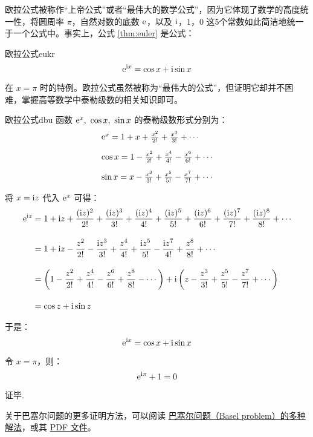 \documentclass[12pt, cn]{elegantart}
\begin{document}
欧拉公式被称作“上帝公式”或者“最伟大的数学公式”，因为它体现了数学的高度统一性，将圆周率 $\pi$，自然对数的底数 $\mathrm{e}$，以及 $\mathrm{i}$，$1$，$0$ 这5个常数如此简洁地统一于一个公式中。事实上，公式 \eqref{thm:euler} 是公式：
\begin{theorem}{欧拉公式}{eukr}
	\begin{equation}\label{ohy}
	\mathrm{e}^{\mathrm{i} x}=\cos x+\mathrm{i} \sin x
\end{equation}
\end{theorem}

在 $x=\pi$ 时的特例。欧拉公式虽然被称为“最伟大的公式”，但证明它却并不困难，掌握高等数学中泰勒级数的相关知识即可。

\begin{theorem}{欧拉公式}{dbu}
	函数 $\mathrm{e}^x,\ \cos x, \ \sin x $ 的泰勒级数形式分别为：
	$$
\begin{array}{l}{\mathrm{e}^{x}=1+x+\frac{x^{2}}{2 !}+\frac{x^{3}}{3 !}+\cdots} \\[10pt]
 {\cos x=1-\frac{x^{2}}{2 !}+\frac{x^{4}}{4 !}-\frac{x^{6}}{6 !}+\cdots} \\[10pt]
 {\sin x=x-\frac{x^{3}}{3 !}+\frac{x^{5}}{5 !}-\frac{x^{7}}{7 !}+\cdots}
 \end{array}
 $$

将 $x=\mathrm{i} z$ 代入 $\mathrm{e}^x$ 可得：
\begin{align*} 
\mathrm{e}^{\mathrm{i} z} &=1+\mathrm{i} z+\frac{(\mathrm{i} z)^{2}}{2 !}+\frac{(\mathrm{i} z)^{3}}{3 !}+\frac{(\mathrm{i} z)^{4}}{4 !}+\frac{(\mathrm{i} z)^{5}}{5 !}+\frac{(\mathrm{i} z)^{6}}{6 !}+\frac{(\mathrm{i} z)^{7}}{7 !}+\frac{(\mathrm{i} z)^{8}}{8 !}+\cdots \\[10pt] &=1+\mathrm{i} z-\frac{z^{2}}{2 !}-\frac{\mathrm{i} z^{3}}{3 !}+\frac{z^{4}}{4 !}+\frac{\mathrm{i} z^{5}}{5 !}-\frac{\mathrm{i} z^{7}}{4 !}+\frac{z^{8}}{8 !}+\cdots \\[10pt] &=\left(1-\frac{z^{2}}{2 !}+\frac{z^{4}}{4 !}-\frac{z^{6}}{6 !}+\frac{z^{8}}{8 !}-\cdots\right)+\mathrm{i}\left(z-\frac{z^{3}}{3 !}+\frac{z^{5}}{5 !}-\frac{z^{7}}{7 !}+\cdots\right) \\[10pt] &=\cos z+\mathrm{i} \sin z 
\end{align*}

于是：
 $$\mathrm{e}^{\mathrm{i} x}=\cos x+\mathrm{i} \sin x
 $$

令 $x=\pi$，则：
$$ \mathrm{e}^{\mathrm{i} \pi}+1=0
$$

证毕.
\end{theorem}
\vspace{15pt}

关于巴塞尔问题的更多证明方法，可以阅读 \href{https://www.cnblogs.com/misaka01034/p/BaselProof.html}{巴塞尔问题（Basel problem）的多种解法}，或其 \href{https://tomben.me/files/pdf/23-proofs-of-basel-problem.pdf}{PDF 文件}。
\end{document}
